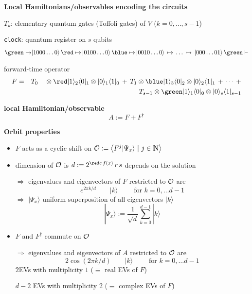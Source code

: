 \documentclass[portrait]{seminar}
\newcommand{\ket}[1]{|#1\rangle}
\newcommand{\bra}[1]{\langle #1|}
\begin{document}
\begin{slide}
{\bf {\large Local Hamiltonians/observables encoding the circuits}}

\vspace{0.25cm}
$T_k$: elementary quantum gates (Toffoli gates) of $V$ ($k=0,\ldots,s-1$)

\texttt{clock}: quantum register on $s$ qubits
\[
{\green \rightarrow}
\ket{1000\ldots 0}\,
{\red \mapsto}\,
\ket{0100\ldots0}\,
{\blue \mapsto}\,
\ket{0010\ldots 0}\,
\mapsto\,
\ldots\,\mapsto\,
\ket{000\ldots 01}\,
{\green \vdash}
\]

forward-time operator
\begin{eqnarray*}
F & = &
T_0\quad \otimes 
{\red \ket{1}_{2}\bra{0}_{1} \otimes \ket{0}_{1}\bra{1}_{0}}
\, +\, 
T_1 \otimes 
{\blue \ket{1}_{3}\bra{0}_{2} \otimes \ket{0}_{2}\bra{1}_{1}}
\, + \,\cdots\,+ \\
& &
T_{s-1} \otimes 
{\green \ket{1}_{1}\bra{0}_{0} \otimes \ket{0}_{s}\bra{1}_{s-1}}
\end{eqnarray*}

{\bf local Hamiltonian/observable}
\[
A:=F+F^\dagger
\]

\end{slide}

\begin{slide}
{\bf {\large Orbit properties}}

\begin{itemize}
\item $F$ acts as a cyclic shift on ${\cal
O}:=\big<F^j\ket{\Psi_x}\,\,|\,\, j\in\N\big>$
\item dimension of ${\cal O}$ is $d:=2^{{\red c \, f(x)}}\, r\, s $\quad
{\red depends on the solution}

$\Longrightarrow$ \quad eigenvalues and eigenvectors of $F$ restricted to
${\cal O}$ are
\[
e^{2\pi k/d}\quad\quad\ket{k}\quad\quad\mbox{ for } k=0,\ldots d-1
\]
$\Longrightarrow$ \quad $\ket{\Psi_x}$ uniform superposition of all
eigenvectors $\ket{k}$
\[
\ket{\Psi_x}:=\frac{1}{\sqrt{d}}\sum_{k=0}^{d-1}\ket{k}
\]
\item $F$ and $F^{\dagger}$ commute on ${\cal O}$ 

$\Longrightarrow$ \quad eigenvalues and eigenvectors of $A$ restricted
to ${\cal O}$ are
\[
2\cos(2\pi k/d)\quad\quad \ket{k}\quad\quad\mbox{ for } k=0,\ldots d-1
\]
\quad\quad $2$\quad EVs with multiplicity $1$ ($\equiv$ real EVs of $F$)

\quad $d-2$ EVs with multiplicity $2$ ($\equiv$ complex EVs of $F$)
\end{itemize}
\end{slide}
\end{document}
